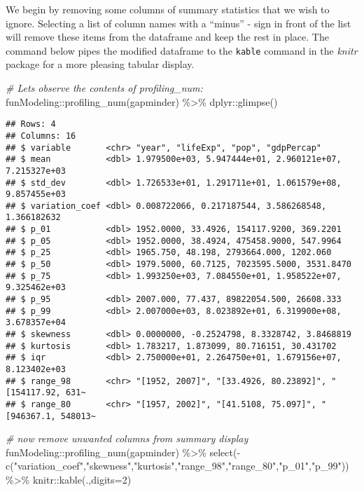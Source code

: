 \documentclass[
]{book}
\newenvironment{Shaded}{\begin{snugshade}}{\end{snugshade}}
\newcommand{\AttributeTok}[1]{\textcolor[rgb]{0.77,0.63,0.00}{#1}}
\newcommand{\CommentTok}[1]{\textcolor[rgb]{0.56,0.35,0.01}{\textit{#1}}}
\newcommand{\DecValTok}[1]{\textcolor[rgb]{0.00,0.00,0.81}{#1}}
\newcommand{\FunctionTok}[1]{\textcolor[rgb]{0.00,0.00,0.00}{#1}}
\newcommand{\NormalTok}[1]{#1}
\newcommand{\SpecialCharTok}[1]{\textcolor[rgb]{0.00,0.00,0.00}{#1}}
\newcommand{\StringTok}[1]{\textcolor[rgb]{0.31,0.60,0.02}{#1}}
\begin{document}
We begin by removing some columns of summary statistics that we wish to ignore. Selecting a list of column names with a ``minus'' - sign in front of the list will remove these items from the dataframe and keep the rest in place. The command below pipes the modified dataframe to the \texttt{kable} command in the \emph{knitr} package for a more pleasing tabular display.

\begin{Shaded}
\begin{Highlighting}[]
\CommentTok{\# Let\textquotesingle{}s observe the contents of profiling\_num:}
\NormalTok{funModeling}\SpecialCharTok{::}\FunctionTok{profiling\_num}\NormalTok{(gapminder) }\SpecialCharTok{\%\textgreater{}\%} 
\NormalTok{  dplyr}\SpecialCharTok{::}\FunctionTok{glimpse}\NormalTok{()}
\end{Highlighting}
\end{Shaded}

\begin{verbatim}
## Rows: 4
## Columns: 16
## $ variable       <chr> "year", "lifeExp", "pop", "gdpPercap"
## $ mean           <dbl> 1.979500e+03, 5.947444e+01, 2.960121e+07, 7.215327e+03
## $ std_dev        <dbl> 1.726533e+01, 1.291711e+01, 1.061579e+08, 9.857455e+03
## $ variation_coef <dbl> 0.008722066, 0.217187544, 3.586268548, 1.366182632
## $ p_01           <dbl> 1952.0000, 33.4926, 154117.9200, 369.2201
## $ p_05           <dbl> 1952.0000, 38.4924, 475458.9000, 547.9964
## $ p_25           <dbl> 1965.750, 48.198, 2793664.000, 1202.060
## $ p_50           <dbl> 1979.5000, 60.7125, 7023595.5000, 3531.8470
## $ p_75           <dbl> 1.993250e+03, 7.084550e+01, 1.958522e+07, 9.325462e+03
## $ p_95           <dbl> 2007.000, 77.437, 89822054.500, 26608.333
## $ p_99           <dbl> 2.007000e+03, 8.023892e+01, 6.319900e+08, 3.678357e+04
## $ skewness       <dbl> 0.0000000, -0.2524798, 8.3328742, 3.8468819
## $ kurtosis       <dbl> 1.783217, 1.873099, 80.716151, 30.431702
## $ iqr            <dbl> 2.750000e+01, 2.264750e+01, 1.679156e+07, 8.123402e+03
## $ range_98       <chr> "[1952, 2007]", "[33.4926, 80.23892]", "[154117.92, 631~
## $ range_80       <chr> "[1957, 2002]", "[41.5108, 75.097]", "[946367.1, 548013~
\end{verbatim}

\begin{Shaded}
\begin{Highlighting}[]
\CommentTok{\# now remove unwanted columns from summary display}
\NormalTok{funModeling}\SpecialCharTok{::}\FunctionTok{profiling\_num}\NormalTok{(gapminder) }\SpecialCharTok{\%\textgreater{}\%}
  \FunctionTok{select}\NormalTok{(}\SpecialCharTok{{-}}\FunctionTok{c}\NormalTok{(}\StringTok{"variation\_coef"}\NormalTok{,}\StringTok{"skewness"}\NormalTok{,}\StringTok{"kurtosis"}\NormalTok{,}\StringTok{"range\_98"}\NormalTok{,}\StringTok{"range\_80"}\NormalTok{,}\StringTok{"p\_01"}\NormalTok{,}\StringTok{"p\_99"}\NormalTok{)) }\SpecialCharTok{\%\textgreater{}\%}
\NormalTok{  knitr}\SpecialCharTok{::}\FunctionTok{kable}\NormalTok{(.,}\AttributeTok{digits=}\DecValTok{2}\NormalTok{)}
\end{Highlighting}
\end{Shaded}
\end{document}
